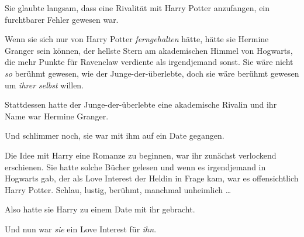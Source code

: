 Sie glaubte langsam, dass eine Rivalität mit Harry Potter anzufangen, ein furchtbarer Fehler gewesen war.

Wenn sie sich nur von Harry Potter \emph{ferngehalten} hätte, hätte sie Hermine Granger sein können, der hellste Stern am akademischen Himmel von Hogwarts, die mehr Punkte für Ravenclaw verdiente als irgendjemand sonst. Sie wäre nicht \emph{so} berühmt gewesen, wie der Junge-der-überlebte, doch sie wäre berühmt gewesen um \emph{ihrer selbst} willen.

Stattdessen hatte der Junge-der-überlebte eine akademische Rivalin und ihr Name war Hermine Granger.

Und schlimmer noch, sie war mit ihm auf ein Date gegangen.

Die Idee mit Harry eine Romanze zu beginnen, war ihr zunächst verlockend erschienen. Sie hatte solche Bücher gelesen und wenn es irgendjemand in Hogwarts gab, der als Love Interest der Heldin in Frage kam, war es offensichtlich Harry Potter. Schlau, lustig, berühmt, manchmal unheimlich …

Also hatte sie Harry zu einem Date mit ihr gebracht.

Und nun war \emph{sie} ein Love Interest für \emph{ihn}.

